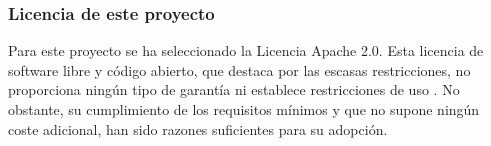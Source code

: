 \subsubsection{Licencia de este proyecto}
Para este proyecto se ha seleccionado la Licencia Apache 2.0. Esta licencia de software libre y código abierto, que destaca por las escasas restricciones, no proporciona ningún tipo de garantía ni establece restricciones de uso \cite{ApacheLi71:online}. No obstante, su cumplimiento de los requisitos mínimos y que no supone ningún coste adicional, han sido razones suficientes para su adopción.
